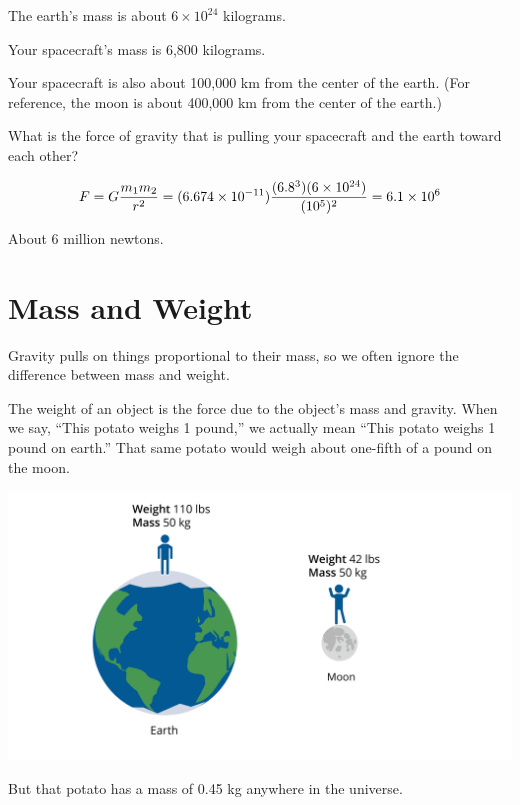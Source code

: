 \begin{Exercise}[title={Gravity}, label=gravity_earth]
  
  The earth's mass is about $6 \times 10^{24}$ kilograms.

  Your spacecraft's mass is 6,800 kilograms.

  Your spacecraft is also about 100,000 km from the center of the earth. (For reference, the moon is about 400,000 km from the center of the earth.)

  What is the force of gravity that is pulling your spacecraft and the earth toward each other?

\end{Exercise}
\begin{Answer}[ref=gravity_earth]

  $$F = G\frac{m_1 m_2}{r^2} = (6.674 \times 10^{-11})\frac{(6.8 \time 10^3)(6 \times 10^{24})}{(10^5)^2} = 6.1 \times 10^{6}$$

  About 6 million newtons.
  
\end{Answer}

\section{Mass and Weight}

Gravity pulls on things proportional to their mass, so we often
ignore the difference between mass and weight.

The weight of an object is the force due to the object's mass and
gravity.  When we say, ``This potato weighs 1 pound,'' we actually mean
``This potato weighs 1 pound on earth.''  That same potato would weigh
about one-fifth of a pound on the moon.

\includegraphics[width=1\textwidth]{massvweight.png}

But that potato has a mass of 0.45 kg anywhere in the universe.
